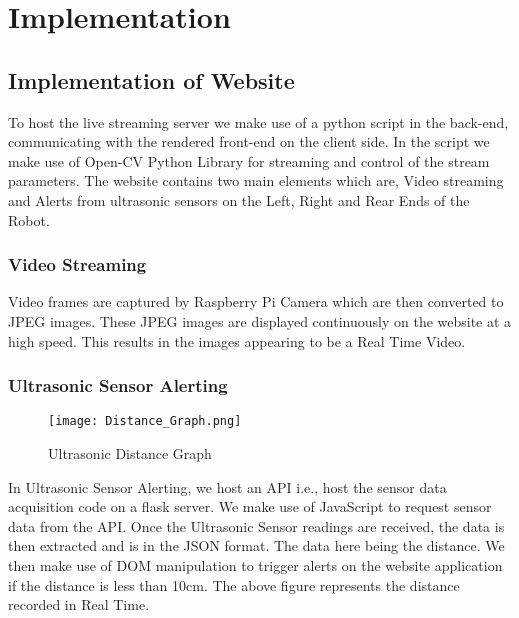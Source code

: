 \chapter{Implementation}
\section{Implementation of Website}
To host the live streaming server we make use of a python script in the back-end, communicating with the rendered front-end on the client side. In the script we make use of Open-CV Python Library for streaming and control of the stream parameters. The website contains two main elements which are, Video streaming and Alerts from ultrasonic sensors on the Left, Right and Rear Ends of the Robot. 
\subsection*{Video Streaming}
Video frames are captured by Raspberry Pi Camera which are then converted to JPEG images. These JPEG images are displayed continuously on the website at a high speed. This results in the images appearing to be a Real Time Video.
\subsection*{Ultrasonic Sensor Alerting}
\begin{figure}[h!]
\centering
\texttt{[image: Distance\_Graph.png]}
\caption{Ultrasonic Distance Graph}
\end{figure}
In Ultrasonic Sensor Alerting, we host an API i.e., host the sensor data acquisition code on a flask server. We make use of JavaScript to request sensor data from the API. Once the Ultrasonic Sensor readings are received, the data is then extracted and is in the JSON format. The data here being the distance.  We then make use of DOM manipulation to trigger alerts on the website application if the distance is less than 10cm.
The above figure represents the distance recorded in Real Time.

